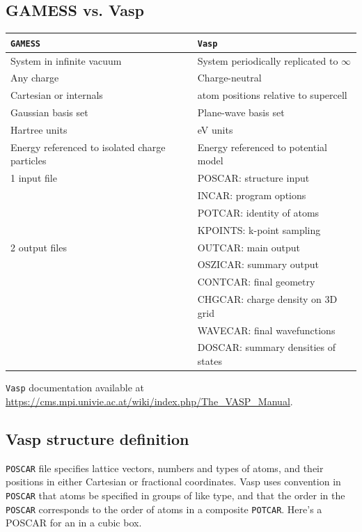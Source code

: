 \documentclass[11pt]{article}
\begin{document}
\subsection{GAMESS vs. Vasp}
\label{sec:org4d1dd77}

\begin{center}
\begin{tabular}{ll}
\hline
\texttt{GAMESS} & \texttt{Vasp}\\
\hline
System in infinite vacuum & System periodically replicated to \(\infty\)\\
Any charge & Charge-neutral\\
Cartesian or internals & atom positions relative to supercell\\
Gaussian basis set & Plane-wave basis set\\
Hartree units & eV units\\
Energy referenced to isolated charge particles & Energy referenced to potential model\\
1 input file & POSCAR: structure input\\
 & INCAR: program options\\
 & POTCAR: identity of atoms\\
 & KPOINTS: k-point sampling\\
2 output files & OUTCAR: main output\\
 & OSZICAR: summary output\\
 & CONTCAR: final geometry\\
 & CHGCAR: charge density on 3D grid\\
 & WAVECAR: final wavefunctions\\
 & DOSCAR: summary densities of states\\
\hline
\end{tabular}
\end{center}

\texttt{Vasp} documentation available at \url{https://cms.mpi.univie.ac.at/wiki/index.php/The\_VASP\_Manual}.
\subsection{Vasp structure definition}
\label{sec:orgfb9150b}
\texttt{POSCAR} file specifies lattice vectors, numbers and types of atoms, and their positions in either Cartesian or fractional coordinates. Vasp uses convention in \texttt{POSCAR} that atoms be specified in groups of like type, and that the order in the \texttt{POSCAR} corresponds to the order of atoms in a composite \texttt{POTCAR}. Here’s a POSCAR for an  in a  cubic box.
\end{document}
